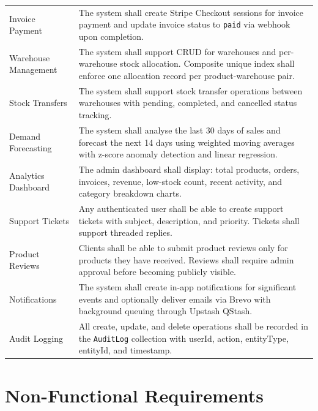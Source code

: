 \documentclass[12pt,a4paper]{report}
\begin{document}
\begin{longtable}{p{}p{}}
    Invoice Payment & The system shall create Stripe Checkout sessions for invoice payment and update invoice status to \texttt{paid} via webhook upon completion. \\
    Warehouse Management & The system shall support CRUD for warehouses and per-warehouse stock allocation. Composite unique index shall enforce one allocation record per product-warehouse pair. \\
    Stock Transfers & The system shall support stock transfer operations between warehouses with pending, completed, and cancelled status tracking. \\
    Demand Forecasting & The system shall analyse the last 30 days of sales and forecast the next 14 days using weighted moving averages with z-score anomaly detection and linear regression. \\
    Analytics Dashboard & The admin dashboard shall display: total products, orders, invoices, revenue, low-stock count, recent activity, and category breakdown charts. \\
    Support Tickets & Any authenticated user shall be able to create support tickets with subject, description, and priority. Tickets shall support threaded replies. \\
    Product Reviews & Clients shall be able to submit product reviews only for products they have received. Reviews shall require admin approval before becoming publicly visible. \\
    Notifications & The system shall create in-app notifications for significant events and optionally deliver emails via Brevo with background queuing through Upstash QStash. \\
    Audit Logging & All create, update, and delete operations shall be recorded in the \texttt{AuditLog} collection with userId, action, entityType, entityId, and timestamp. \\
    \bottomrule
\end{longtable}

\section{Non-Functional Requirements}
\end{document}
